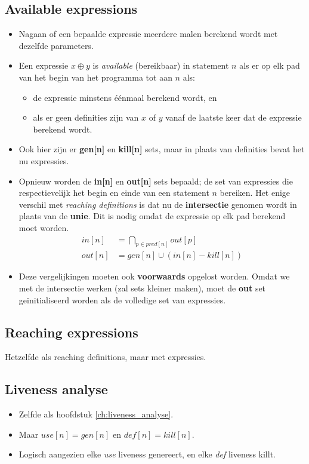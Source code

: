 \begin{itemize}
\end{itemize}

\subsection{Available expressions}
\begin{itemize}
	\item Nagaan of een bepaalde expressie meerdere malen berekend wordt met dezelfde parameters.
	\item Een expressie $x \oplus y$ is \textit{available} (bereikbaar) in statement $n$ als er op elk pad van het begin van het programma tot aan $n$ als:
	\begin{itemize}
		\item de expressie minstens éénmaal berekend wordt, en
		\item als er geen definities zijn van $x$ of $y$ vanaf de laatste keer dat de expressie berekend wordt.
	\end{itemize} 
	\item Ook hier zijn er \textbf{gen[n]} en \textbf{kill[n]} sets, maar in plaats van definities bevat het nu expressies.
	\item Opnieuw worden de \textbf{in[n]} en \textbf{out[n]} sets bepaald; de set van expressies die respectievelijk het begin en einde van een statement $n$ bereiken. Het enige verschil met \textit{reaching definitions} is dat nu de \textbf{intersectie} genomen wordt in plaats van de \textbf{unie}. Dit is nodig omdat de expressie op elk pad berekend moet worden.
	\begin{align*}
		in[n] & = \bigcap_{p \in pred[n]} out[p] \\
		out[n] & = gen[n] \cup (in[n] - kill[n])
	\end{align*}
	\item Deze vergelijkingen moeten ook \textbf{voorwaards} opgelost worden.
	\alert Omdat we met de intersectie werken (zal sets kleiner maken), moet de \textbf{out} set geïnitialiseerd worden als de volledige set van expressies.
\end{itemize}
\subsection{Reaching expressions}
Hetzelfde als reaching definitions, maar met expressies.
\subsection{Liveness analyse}
\begin{itemize}
	\item Zelfde als hoofdstuk \ref{ch:liveness_analyse}.
	\item Maar $use[n] = gen[n]$ en $def[n] = kill[n]$.
	\item Logisch aangezien elke \textit{use} liveness genereert, en elke \textit{def} liveness killt.
\end{itemize}


